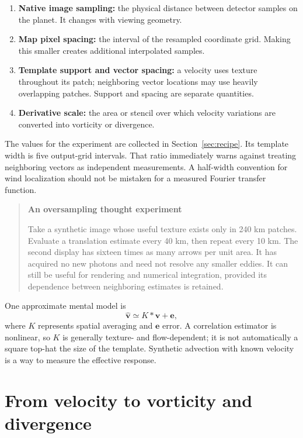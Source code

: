 \documentclass[11pt]{article}
\newcommand{\vel}{\bm{v}}
\newenvironment{teaching}[1]{\begin{quote}\small\textbf{#1}\par}{\end{quote}}
\begin{document}
\begin{enumerate}
 \item \textbf{Native image sampling:} the physical distance between
 detector samples on the planet. It changes with viewing geometry.
 \item \textbf{Map pixel spacing:} the interval of the resampled coordinate
 grid. Making this smaller creates additional interpolated samples.
 \item \textbf{Template support and vector spacing:} a velocity uses texture
 throughout its patch; neighboring vector locations may use heavily
 overlapping patches. Support and spacing are separate quantities.
 \item \textbf{Derivative scale:} the area or stencil over which velocity
 variations are converted into vorticity or divergence.
\end{enumerate}

The values for the experiment are collected in Section~\ref{sec:recipe}.
Its template width is five output-grid intervals. That ratio immediately
warns against treating neighboring vectors as independent measurements.
A half-width convention for wind localization should not be mistaken for
a measured Fourier transfer function.

\begin{teaching}{An oversampling thought experiment}
Take a synthetic image whose useful texture exists only in 240 km patches.
Evaluate a translation estimate every 40 km, then repeat every 10 km.
The second display has sixteen times as many arrows per unit area.
It has acquired no new photons and need not resolve any smaller eddies.
It can still be useful for rendering and numerical integration, provided
its dependence between neighboring estimates is retained.
\end{teaching}

One approximate mental model is
\begin{equation}
 \widehat{\vel}\simeq K*\vel+\bm{e},
\end{equation}
where $K$ represents spatial averaging and $\bm{e}$ error. A correlation
estimator is nonlinear, so $K$ is generally texture- and flow-dependent;
it is not automatically a square top-hat the size of the template. Synthetic
advection with known velocity is a way to measure the effective response.

\section{From velocity to vorticity and divergence}
\end{document}
